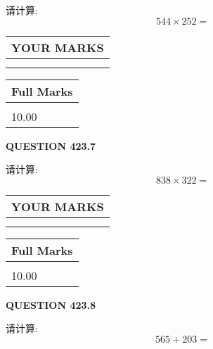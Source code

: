 \documentclass{ctexart}
\begin{document}
  
 
请计算:
\begin{equation}
544  \times    %
252 = \nonumber
\end{equation}
 

 

 
  
\vspace{0.2in}
  
\noindent\begin{tabular}{|l|}
\hline
 YOUR MARKS  \\
\hline
 \\ 
 \\ 
\hline
\end{tabular}
\hspace{0.05in} \begin{tabular}{|l|}
\hline
 Full Marks  \\
\hline
 \\ 
10.00 \\
\hline
\end{tabular}
{\textbf{\Large{QUESTION
423.7 
}}}
  
  
 
请计算:
\begin{equation}
838  \times    %
322 = \nonumber
\end{equation}
 

 

 
  
\vspace{0.2in}
  
\noindent\begin{tabular}{|l|}
\hline
 YOUR MARKS  \\
\hline
 \\ 
 \\ 
\hline
\end{tabular}
\hspace{0.05in} \begin{tabular}{|l|}
\hline
 Full Marks  \\
\hline
 \\ 
10.00 \\
\hline
\end{tabular}
{\textbf{\Large{QUESTION
423.8 
}}}
  
  
 
请计算:
\begin{equation}
565 +  %
203 = \nonumber
\end{equation}
 

 

 
  
\end{document}

